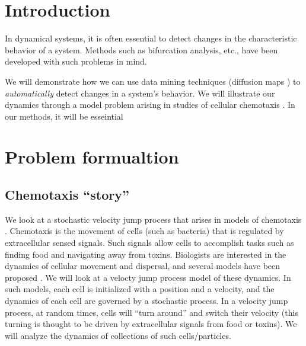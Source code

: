 \documentclass[prl,reprint]{revtex4-1}
\begin{document}

\maketitle

\section{Introduction} 
 
In dynamical systems, it is often essential to detect changes in the characteristic behavior of a system.
%
Methods such as bifurcation analysis, etc., have been developed with such problems in mind. 

We will demonstrate how we can use data mining techniques (diffusion maps \cite{coifman2005geometric}) to {\em automatically} detect changes in a system's behavior.
%
We will illustrate our dynamics through a model problem arising in studies of cellular chemotaxis \cite{othmer2000diffusion}.
%
In our methods, it will be esseintial 


\section{Problem formualtion}

\subsection{Chemotaxis ``story''} 

We look at a stochastic velocity jump process that arises in models of chemotaxis \cite{othmer2000diffusion}.
%
Chemotaxis is the movement of cells (such as bacteria) that is regulated by extracellular sensed signals.
%
Such signals allow cells to accomplish tasks such as finding food and navigating away from toxins.
%
Biologists are interested in the dynamics of cellular movement and dispersal, and several models have been proposed \cite{othmer1988models, codling2008random}.
%
We will look at a velocty jump process model of these dynamics.
%
In such models, each cell is initialized with a position and a velocity, and the dynamics of each cell are governed by a stochastic process.
%
In a velocity jump process, at random times, cells will ``turn around'' and switch their velocity (this turning is thought to be driven by extracellular signals from food or toxins). 
%
We will analyze the dynamics of collections of such cells/particles. 
\end{document}
